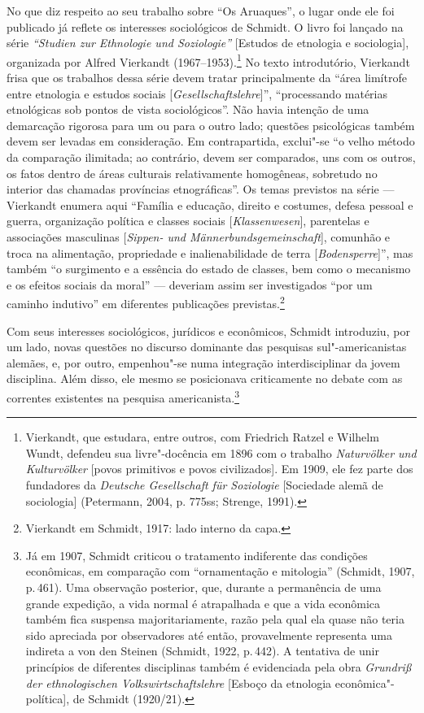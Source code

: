 No que diz respeito ao seu trabalho sobre ``Os Aruaques'', o lugar onde
ele foi publicado já reflete os interesses sociológicos de Schmidt. O
livro foi lançado na série \textit{``Studien zur Ethnologie und
Soziologie''} {[}Estudos de etnologia e sociologia{]}, organizada por
Alfred Vierkandt (1967--1953).\footnote{Vierkandt, que estudara, entre
  outros, com Friedrich Ratzel e Wilhelm Wundt, defendeu sua
  livre"-docência em 1896 com o trabalho \textit{Naturvölker und
  Kulturvölker} {[}povos primitivos e povos civilizados{]}. Em 1909, ele
  fez parte dos fundadores da \textit{Deutsche Gesellschaft für
  Soziologie} {[}Sociedade alemã de sociologia{]} (Petermann, 2004, p.
  775ss; Strenge, 1991).} No texto introdutório, Vierkandt frisa que os
trabalhos dessa série devem tratar principalmente da ``área limítrofe
entre etnologia e estudos sociais {[}\textit{Gesellschaftslehre}{]}'',
``processando matérias etnológicas sob pontos de vista sociológicos''.
Não havia intenção de uma demarcação rigorosa para um ou para o outro
lado; questões psicológicas também devem ser levadas em consideração. Em
contrapartida, exclui"-se ``o velho método da comparação ilimitada; ao
contrário, devem ser comparados, uns com os outros, os fatos dentro de
áreas culturais relativamente homogêneas, sobretudo no interior das
chamadas províncias etnográficas''. Os temas previstos na série ---
Vierkandt enumera aqui ``Família e educação, direito e costumes, defesa
pessoal e guerra, organização política e classes sociais
{[}\textit{Klassenwesen}{]}, parentelas e associações masculinas
{[}\textit{Sippen- und Männerbundsgemeinschaft}{]}, comunhão e troca na
alimentação, propriedade e inalienabilidade de terra
{[}\textit{Bodensperre}{]}'', mas também ``o surgimento e a essência do
estado de classes, bem como o mecanismo e os efeitos sociais da moral''
--- deveriam assim ser investigados ``por um caminho indutivo'' em
diferentes publicações previstas.\footnote{Vierkandt em Schmidt, 1917:
  lado interno da capa.}

Com seus interesses sociológicos, jurídicos e econômicos, Schmidt
introduziu, por um lado, novas questões no discurso dominante das
pesquisas sul"-americanistas alemães, e, por outro, empenhou"-se numa
integração interdisciplinar da jovem disciplina. Além disso, ele mesmo
se posicionava criticamente no debate com as correntes existentes na
pesquisa americanista.\footnote{Já em 1907, Schmidt criticou o
  tratamento indiferente das condições econômicas, em comparação com
  ``ornamentação e mitologia'' (Schmidt, 1907, p.\,461). Uma observação
  posterior, que, durante a permanência de uma grande expedição, a vida
  normal é atrapalhada e que a vida econômica também fica suspensa
  majoritariamente, razão pela qual ela quase não teria sido apreciada
  por observadores até então, provavelmente representa uma indireta a
  von den Steinen (Schmidt, 1922, p.\,442). A tentativa de unir
  princípios de diferentes disciplinas também é evidenciada pela obra
  \textit{Grundriß der ethnologischen Volkswirtschaftslehre} {[}Esboço da
  etnologia econômica"-política{]}, de Schmidt (1920/21).}

